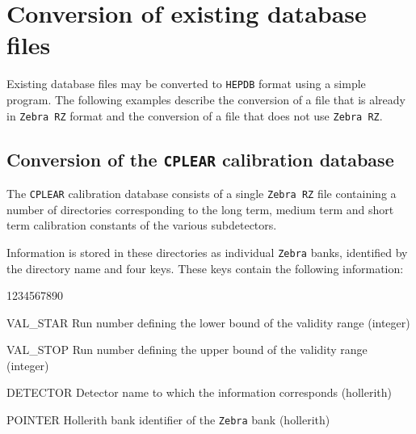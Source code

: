 \chapter{Conversion of existing database files}

Existing database files may be converted to {\tt HEPDB} format
using a simple program. The following examples describe the
conversion of a file that is already in {\tt Zebra RZ} format
and the conversion of a file that does not use {\tt Zebra RZ}.

\section{Conversion of the {\tt CPLEAR} calibration database}

The {\tt CPLEAR} calibration database consists of a single
{\tt Zebra RZ} file containing a number of directories
corresponding to the long term, medium term and short term
calibration constants of the various subdetectors.

Information is stored in these directories as individual {\tt Zebra}
banks, identified by the directory name and four keys. These
keys contain the following information:

\begin{DLtt}{1234567890}
\item[VAL\_STAR]Run number defining the lower bound of the validity range (integer)
\item[VAL\_STOP]Run number defining the upper bound of the validity range (integer)
\item[DETECTOR]Detector name to which the information corresponds (hollerith)
\item[POINTER]Hollerith bank identifier of the {\tt Zebra} bank (hollerith)
\end{DLtt}

